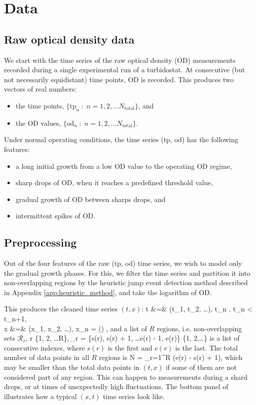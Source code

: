 \section{Data}

\subsection{Raw optical density data}
We start with the time series of the raw optical density (OD) measurements recorded during a single experimental run of a turbidostat. At consecutive (but not necessarily equidistant) time points, OD is recorded. This produces two vectors of real numbers:
\begin{itemize}
	\item the time points, $\{\text{tp}_n\;:\; n = 1,2, \ldots N_\text{total}\}$, and
	\item the OD values, $\{\text{od}_n\;:\; n = 1,2, \ldots N_\text{total}\}$.
\end{itemize}
Under normal operating conditions, the time series (tp, od) has the following features:
\begin{itemize}
	\item a long initial growth from a low OD value to the operating OD regime,
	\item sharp drops of OD, when it reaches a predefined threshold value,
	\item gradual growth of OD between sharps drops, and
	\item intermittent spikes of OD.
\end{itemize}

\subsection{Preprocessing}
Out of the four features of the raw (tp, od) time series, we wish to model only the gradual growth phases. For this, we filter the time series and partition it into non-overlapping regions by the heuristic jump event detection method described in Appendix \ref{app:heuristic_method}, and take the logarithm of OD.

This produces the cleaned time series $(t, x)$:
\ba
	t &=& (t_1, t_2, \ldots), \quad {}\; t_n \in {},\quad {}\; t_n < t_{n+1}, \\
	x &=& (x_1, x_2, \ldots), \quad {}\; x_n = \log() \in {},
\ea
and a list of $R$ regions, i.e. non-overlapping sets $\mathcal{R}_r$,
\be
	r \in \{1, 2, \ldots R\},\qquad {}\,_r = \{s(r), s(r) + 1, \ldots e(r) - 1, e(r)\} \subset \{1, 2,\ldots\}
\ee
is a list of consecutive indexes, where $s(r)$ is the first and $e(r)$ is the last. The total number of data points in all $R$ regions is
\be
	N = \sum_{r=1}^R (e(r) - s(r) + 1),
\ee
which may be smaller than the total data points in $(t,x)$ if some of them are not considered part of any region. This can happen to measurements during a shard drops, or at times of unexpectedly high fluctuations.
The bottom panel of  illustrates how a typical $(x,t)$ time series look like.

